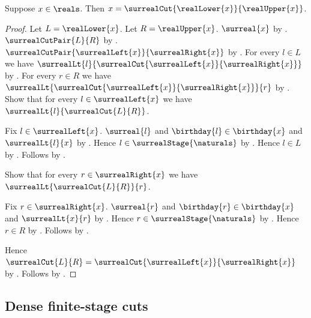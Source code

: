 \begin{theorem}\label{surreal_real_canonical_cut}
    Suppose $x\in\reals$.
    Then $x=\surrealCut{\realLower{x}}{\realUpper{x}}$.
\end{theorem}
\begin{proof}
    Let $L=\realLower{x}$.
    Let $R=\realUpper{x}$.
    $\surreal{x}$ by .
    $\surrealCutPair{L}{R}$
        by .
    $\surrealCutPair{\surrealLeft{x}}{\surrealRight{x}}$
        by .
    For every $l\in L$ we have
        $\surrealLt{l}{\surrealCut{\surrealLeft{x}}{\surrealRight{x}}}$
        by .
    For every $r\in R$ we have
        $\surrealLt{\surrealCut{\surrealLeft{x}}{\surrealRight{x}}}{r}$
        by .
    Show that for every $l\in\surrealLeft{x}$ we have
        $\surrealLt{l}{\surrealCut{L}{R}}$.
    \begin{subproof}
        Fix $l\in\surrealLeft{x}$.
        $\surreal{l}$ and $\birthday{l}\in\birthday{x}$ and
            $\surrealLt{l}{x}$
            by .
        Hence $l\in\surrealStage{\naturals}$
            by .
        Hence $l\in L$ by .
        Follows by .
    \end{subproof}
    Show that for every $r\in\surrealRight{x}$ we have
        $\surrealLt{\surrealCut{L}{R}}{r}$.
    \begin{subproof}
        Fix $r\in\surrealRight{x}$.
        $\surreal{r}$ and $\birthday{r}\in\birthday{x}$ and
            $\surrealLt{x}{r}$
            by .
        Hence $r\in\surrealStage{\naturals}$
            by .
        Hence $r\in R$ by .
        Follows by .
    \end{subproof}
    Hence $\surrealCut{L}{R}
        =\surrealCut{\surrealLeft{x}}{\surrealRight{x}}$
        by .
    Follows by .
\end{proof}

\subsection{Dense finite-stage cuts}

